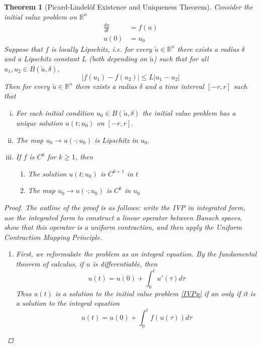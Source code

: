 \documentclass[12pt]{amsart}         %
\newtheorem{theorem}{Theorem}[section]
\theoremstyle{remark}
\newcommand{\R}{\mathbb{R}}
\begin{document}
\begin{theorem}[Picard-Lindel\"{o}f Existence and Uniqueness Theorem]
Consider the initial value problem on $\R^n$
\begin{align}\label{IVPp}
\frac{du}{dt} &= f(u) \\
u(0) &= u_0 \nonumber
\end{align}
Suppose that $f$ is locally Lipschitz, i.e. for every $\tilde{u} \in \R^n$ there exists a radius $\delta$ and a Lipschitz constant $L$ (both depending on $\tilde{u}$) such that for all $u_1, u_2 \in B(\tilde{u}, \delta)$,
\[
|f(u_1) - f(u_2)| \leq L|u_1 - u_2|
\]
Then for every $\tilde{u} \in \R^n$ there exists a radius $\delta$ and a time interval $[-r, r]$ such that
\begin{enumerate}[(i)]
\item For each initial condition $u_0 \in B(\tilde{u}, \delta)$ the initial value problem has a unique solution $u(t; u_0)$ on $[-r, r]$.
\item The map $u_0 \rightarrow u(\cdot; u_0)$ is Lipschitz in $u_0$.
\item If $f$ is $C^k$ for $k \geq 1$, then
\begin{enumerate}
\item The solution $u(t; u_0)$ is $C^{k+1}$ in $t$
\item The map $u_0 \rightarrow u(\cdot; u_0)$ is $C^k$ in $u_0$
\end{enumerate}
\end{enumerate}
\begin{proof}
The outline of the proof is as follows: write the IVP in integrated form, use the integrated form to construct a linear operator between Banach spaces, show that this operator is a uniform contraction, and then apply the Uniform Contraction Mapping Principle.
\begin{enumerate}

\item First, we reformulate the problem as an integral equation. By the fundamental theorem of calculus, if $u$ is differentiable, then
\begin{equation*}
u(t) = u(0) + \int_0^t u'(\tau) d \tau
\end{equation*}
Thus $u(t)$ is a solution to the initial value problem \eqref{IVPp} if an only if it is a solution to the integral equation
\begin{equation}\label{intform}
u(t) = u(0) + \int_0^t f(u(\tau)) d \tau
\end{equation}


\end{enumerate}
\end{proof}
\end{theorem}
\end{document}
